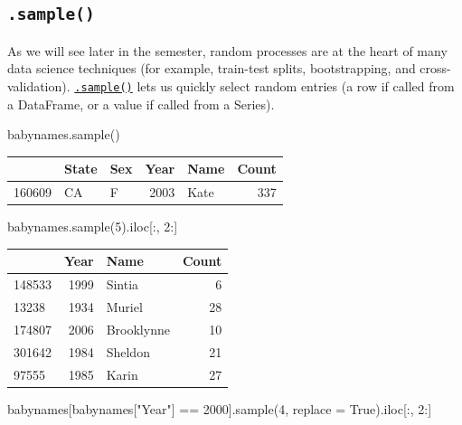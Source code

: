 \documentclass[
  letterpaper,
  DIV=11,
  numbers=noendperiod]{scrreprt}
\newenvironment{Shaded}{\begin{snugshade}}{\end{snugshade}}
\newcommand{\DecValTok}[1]{\textcolor[rgb]{0.68,0.00,0.00}{#1}}
\newcommand{\NormalTok}[1]{\textcolor[rgb]{0.00,0.23,0.31}{#1}}
\newcommand{\OperatorTok}[1]{\textcolor[rgb]{0.37,0.37,0.37}{#1}}
\newcommand{\StringTok}[1]{\textcolor[rgb]{0.13,0.47,0.30}{#1}}
\newcommand{\VariableTok}[1]{\textcolor[rgb]{0.07,0.07,0.07}{#1}}
\begin{document}
\hypertarget{sample}{%
\subsection{\texorpdfstring{\texttt{.sample()}}{.sample()}}\label{sample}}

As we will see later in the semester, random processes are at the heart
of many data science techniques (for example, train-test splits,
bootstrapping, and cross-validation).
\href{https://pandas.pydata.org/docs/reference/api/pandas.DataFrame.sample.html}{\texttt{.sample()}}
lets us quickly select random entries (a row if called from a DataFrame,
or a value if called from a Series).

\begin{Shaded}
\begin{Highlighting}[]
\NormalTok{babynames.sample()}
\end{Highlighting}
\end{Shaded}

\begin{tabular}{lllrlr}
\toprule
{} & State & Sex &  Year &  Name &  Count \\
\midrule
160609 &    CA &   F &  2003 &  Kate &    337 \\
\bottomrule
\end{tabular}

\begin{Shaded}
\begin{Highlighting}[]
\NormalTok{babynames.sample(}\DecValTok{5}\NormalTok{).iloc[:, }\DecValTok{2}\NormalTok{:]}
\end{Highlighting}
\end{Shaded}

\begin{tabular}{lrlr}
\toprule
{} &  Year &        Name &  Count \\
\midrule
148533 &  1999 &      Sintia &      6 \\
13238  &  1934 &      Muriel &     28 \\
174807 &  2006 &  Brooklynne &     10 \\
301642 &  1984 &     Sheldon &     21 \\
97555  &  1985 &       Karin &     27 \\
\bottomrule
\end{tabular}

\begin{Shaded}
\begin{Highlighting}[]
\NormalTok{babynames[babynames[}\StringTok{"Year"}\NormalTok{] }\OperatorTok{==} \DecValTok{2000}\NormalTok{].sample(}\DecValTok{4}\NormalTok{, replace }\OperatorTok{=} \VariableTok{True}\NormalTok{).iloc[:, }\DecValTok{2}\NormalTok{:]}
\end{Highlighting}
\end{Shaded}
\end{document}
